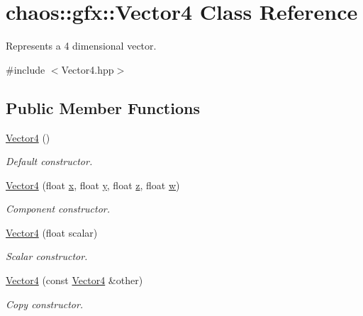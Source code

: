 \hypertarget{classchaos_1_1gfx_1_1_vector4}{\section{chaos\-:\-:gfx\-:\-:Vector4 Class Reference}
\label{classchaos_1_1gfx_1_1_vector4}
}


Represents a 4 dimensional vector.  




{\ttfamily \#include $<$Vector4.\-hpp$>$}

\subsection*{Public Member Functions}
\begin{DoxyCompactItemize}
\item 
\hyperlink{classchaos_1_1gfx_1_1_vector4_abdee87e0c5bbd7a9870957951f2bba80}{Vector4} ()
\begin{DoxyCompactList}\small\item\em Default constructor. \end{DoxyCompactList}\item 
\hyperlink{classchaos_1_1gfx_1_1_vector4_a8e22c6ae7ba175d15bd8804cff77519e}{Vector4} (float \hyperlink{classchaos_1_1gfx_1_1_vector4_a74f8e26ec8f6c55a11ed5a423fb0eec4}{x}, float \hyperlink{classchaos_1_1gfx_1_1_vector4_aa823679c8ce9d8b882f7e05f5670ee74}{y}, float \hyperlink{classchaos_1_1gfx_1_1_vector4_ae1e282cb0c262db6c20f29c34d727938}{z}, float \hyperlink{classchaos_1_1gfx_1_1_vector4_a3cd40a2e6ce1fd10a0d2c8136965e9dd}{w})
\begin{DoxyCompactList}\small\item\em Component constructor. \end{DoxyCompactList}\item 
\hyperlink{classchaos_1_1gfx_1_1_vector4_aa2630f2dfef3d7a9ae5b284be502f528}{Vector4} (float scalar)
\begin{DoxyCompactList}\small\item\em Scalar constructor. \end{DoxyCompactList}\item 
\hyperlink{classchaos_1_1gfx_1_1_vector4_aabd97977b6470d2e03ab15d7fe5e0678}{Vector4} (const \hyperlink{classchaos_1_1gfx_1_1_vector4}{Vector4} \&other)
\begin{DoxyCompactList}\small\item\em Copy constructor. \end{DoxyCompactList}\item 

\end{DoxyCompactItemize}
